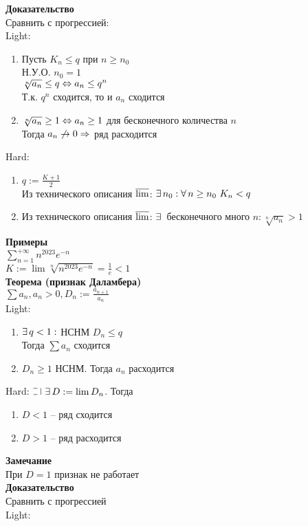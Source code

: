 \documentclass[12pt]{article}
\begin{document}
\textbf{Доказательство}\\
Сравнить с прогрессией:\\
Light:
\begin{enumerate}
    \item Пусть $K_n \leq q$ при $n \geq n_0$\\
    Н.У.О. $n_0 = 1$\\
    $\sqrt[n]{a_n} \leq q \Leftrightarrow a_n \leq q^n$\\
    Т.к. $q^n$ сходится, то и $a_n$ сходится
    \item $\sqrt[n]{a_n} \geq 1 \Leftrightarrow a_n \geq 1$ для бесконечного количества $n$\\
    Тогда $a_n \not\rightarrow 0 \Rightarrow$ ряд расходится
\end{enumerate}
Hard:
\begin{enumerate}
    \item $q:=\frac{K+1}2$\\
    Из технического описания $\operatorname*{\overline{lim}}$: $\exists\, n_0: \forall\, n \geq n_0\ K_n < q$
    \item Из технического описания $\operatorname*{\overline{lim}}$: $\exists\,$ бесконечного много $n: \sqrt[n]{a_n} > 1$
\end{enumerate}
\textbf{Примеры}\\
$\sum_{n=1}^{+\infty} n^{2023}e^{-n}$\\
$K:= \lim \sqrt[n]{n^{2023}e^{-n}}=\frac1e < 1$\\
\textbf{Теорема (признак Даламбера)}\\
$\sum a_n, a_n > 0, D_n := \frac{a_{n+1}}{a_n}$\\
Light:\begin{enumerate}
    \item $\exists\, q < 1: $ НСНМ $D_n \leq q$\\
    Тогда $\sum a_n$ сходится
    \item $D_n \geq 1$ НСНМ. Тогда $a_n$ расходится
\end{enumerate}
Hard: $\letus\ \ex D:=\lim D_n$. Тогда \begin{enumerate}
    \item $D < 1$ -- ряд сходится
    \item $D > 1$ -- ряд расходится
\end{enumerate}
\textbf{Замечание}\\
При $D=1$ признак не работает\\
\textbf{Доказательство}\\
Сравнить с прогрессией\\
Light:\\
\end{document}
